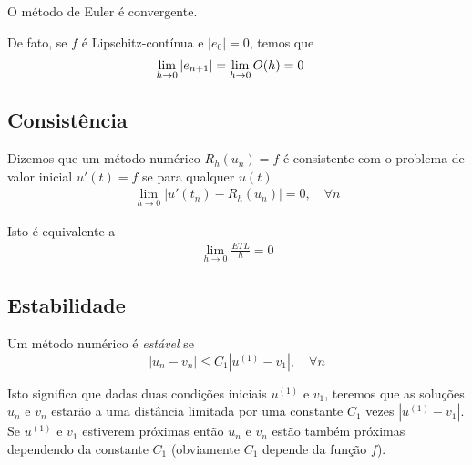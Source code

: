 \begin{teo}
O método de Euler é convergente.
\end{teo}

De fato, se $f$ é Lipschitz-contínua e $|e_0|=0$, temos que
\begin{eqnarray}
 \lim_{h\rightarrow 0} |e_{n+1}|  &= \lim_{h\rightarrow 0} \mathcal \mathcal{O}(h) = 0
\end{eqnarray}


\subsection{Consistência}
\begin{defn}
Dizemos que um método numérico $R_h(u_n)=f$ é consistente com o problema de valor inicial $u'(t)=f$ se para qualquer $u(t)$
\begin{eqnarray}
  \lim_{h \rightarrow 0} |u'(t_n)-R_h(u_n)| = 0, \quad  \forall n
\end{eqnarray}
\end{defn}

Isto é equivalente a
\begin{eqnarray}
  \lim_{h \rightarrow 0} \frac{ETL}{h} = 0
\end{eqnarray}



%
%

\subsection{Estabilidade}
\begin{defn}
Um método numérico é \emph{estável} se
$$ |u_n-v_n| \leq  C_1|u^{(1)}-v_1|, \quad  \forall n$$
\end{defn}
Isto significa que dadas duas condições iniciais $u^{(1)}$ e $v_1$, teremos que as soluções $u_n$ e $v_n$ estarão a uma distância limitada  por uma constante $C_1$ vezes $|u^{(1)}-v_1|$. Se $u^{(1)}$ e $v_1$ estiverem próximas então $u_n$ e $v_n$ estão também próximas dependendo da constante $C_1$ (obviamente $C_1$ depende da função $f$).


